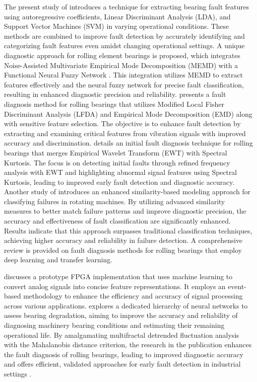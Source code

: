 \documentclass[sn-basic,pdflatex]{sn-jnl}
\theoremstyle{remark}
\theoremstyle{definition}
\begin{document}
The present study of \citet{WOS:000440977000032} introduces a technique
for extracting bearing fault features using autoregressive coefficients,
Linear Discriminant Analysis (LDA), and Support Vector Machines (SVM) in
varying operational conditions. These methods are combined to improve
fault detection by accurately identifying and categorizing fault
features even amidst changing operational settings. A unique diagnostic
approach for rolling element bearings is proposed, which integrates
Noise-Assisted Multivariate Empirical Mode Decomposition (MEMD) with a
Functional Neural Fuzzy Network \citep{WOS:000434717400001}. This
integration utilizes MEMD to extract features effectively and the neural
fuzzy network for precise fault classification, resulting in enhanced
diagnostic precision and reliability. \citet{WOS:000426284100001}
presents a fault diagnosis method for rolling bearings that utilizes
Modified Local Fisher Discriminant Analysis (LFDA) and Empirical Mode
Decomposition (EMD) along with sensitive feature selection. The
objective is to enhance fault detection by extracting and examining
critical features from vibration signals with improved accuracy and
discrimination. \citet{WOS:000539546400083} details an initial fault
diagnosis technique for rolling bearings that merges Empirical Wavelet
Transform (EWT) with Spectral Kurtosis. The focus is on detecting
initial faults through refined frequency analysis with EWT and
highlighting abnormal signal features using Spectral Kurtosis, leading
to improved early fault detection and diagnostic accuracy. Another study
of \citet{hakim2023systematic} introduces an enhanced similarity-based
modeling approach for classifying failures in rotating machines. By
utilizing advanced similarity measures to better match failure patterns
and improve diagnostic precision, the accuracy and effectiveness of
fault classification are significantly enhanced. Results indicate that
this approach surpasses traditional classification techniques, achieving
higher accuracy and reliability in failure detection. A comprehensive
review is provided on fault diagnosis methods for rolling bearings that
employ deep learning and transfer learning.

\citet{WOS:000345844100102} discusses a prototype FPGA implementation
that uses machine learning to convert analog signals into concise
feature representations. It employs an event-based methodology to
enhance the efficiency and accuracy of signal processing across various
applications. \citet{WOS:000396580800080} explores a dedicated hierarchy
of neural networks to assess bearing degradation, aiming to improve the
accuracy and reliability of diagnosing machinery bearing conditions and
estimating their remaining operational life. By amalgamating
multifractal detrended fluctuation analysis with the Mahalanobis
distance criterion, the research in the publication enhances the fault
diagnosis of rolling bearings, leading to improved diagnostic accuracy
and offers efficient, validated approaches for early fault detection in
industrial settings \citep{WOS:000320835800016}.
\end{document}

